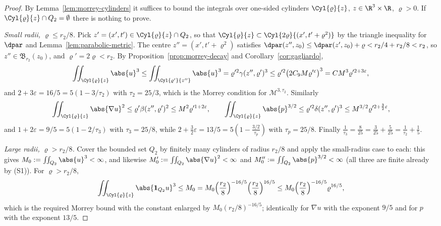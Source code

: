 \documentclass[11pt,reqno]{amsart}
\begin{document}
\begin{proof}
By Lemma~\ref{lem:morrey-cylinders} it suffices to bound the integrals over
one-sided cylinders $\Cyl{\varrho}{z}$, $z\in\R^{3}\times\R$, $\varrho>0$. If
$\Cyl{\varrho}{z}\cap Q_{2}=\emptyset$ there is nothing to prove.

\emph{Small radii, $\varrho\le r_{2}/8$.} Pick
$z'=(x',t')\in\Cyl{\varrho}{z}\cap Q_{2}$, so that
$\Cyl{\varrho}{z}\subset\Cyl{2\varrho}{(x',t'+\varrho^{2})}$ by the triangle
inequality for $\dpar$ and Lemma~\ref{lem:parabolic-metric}. The centre
$z''=(x',t'+\varrho^{2})$ satisfies
$\dpar(z'',z_{0})\le\dpar(z',z_{0})+\varrho<r_{2}/4+r_{2}/8<r_{2}$, so
$z''\in\mathfrak{B}_{r_{2}}(z_{0})$, and $\varrho'=2\varrho<r_{2}$. By Proposition~\ref{prop:morrey-decay} and
Corollary~\ref{cor:gagliardo},
\[
  \iint_{\Cyl{\varrho}{z}}\abs{u}^{3}
  \le\iint_{\Cyl{\varrho'}{z''}}\abs{u}^{3}
  =\varrho'^{2}\gamma(z'',\varrho')^{3}
  \le\varrho'^{2}\bigl(2C_{9}M\varrho'^{\varepsilon}\bigr)^{3}
  =C M^{3}\varrho'^{2+3\varepsilon},
\]
and $2+3\varepsilon=16/5=5(1-3/\tau_{2})$ with $\tau_{2}=25/3$, which is the
Morrey condition for $\mathcal{M}^{3,\tau_{2}}$. Similarly
\[
  \iint_{\Cyl{\varrho}{z}}\abs{\nabla u}^{2}\le\varrho'\beta(z'',\varrho')^{2}
  \le M^{2}\varrho'^{1+2\varepsilon},
  \qquad
  \iint_{\Cyl{\varrho}{z}}\abs{p}^{3/2}\le\varrho'^{2}\delta(z'',\varrho')^{3}
  \le M^{3/2}\varrho'^{2+\frac32\varepsilon},
\]
and $1+2\varepsilon=9/5=5(1-2/\tau_{3})$ with $\tau_{3}=25/8$, while
$2+\tfrac32\varepsilon=13/5=5(1-\tfrac{3/2}{\tau_{p}})$ with $\tau_{p}=25/8$.
Finally $\tfrac1{\tau_{3}}=\tfrac8{25}=\tfrac3{25}+\tfrac5{25}
 =\tfrac1{\tau_{2}}+\tfrac15$.

\emph{Large radii, $\varrho>r_{2}/8$.} Cover the bounded set $Q_{2}$ by finitely
many cylinders of radius $r_{2}/8$ and apply the small-radius case to each: this
gives $M_{0}:=\iint_{Q_{2}}\abs{u}^{3}<\infty$, and likewise
$M_{0}':=\iint_{Q_{2}}\abs{\nabla u}^{2}<\infty$ and
$M_{0}'':=\iint_{Q_{2}}\abs{p}^{3/2}<\infty$ (all three are finite already by
(S1)). For $\varrho>r_{2}/8$,
\[
  \iint_{\Cyl{\varrho}{z}}\abs{\mathbf{1}_{Q_{2}}u}^{3}\le M_{0}
  =M_{0}\Bigl(\frac{r_{2}}8\Bigr)^{-16/5}\Bigl(\frac{r_{2}}8\Bigr)^{16/5}
  \le M_{0}\Bigl(\frac{r_{2}}8\Bigr)^{-16/5}\varrho^{16/5},
\]
which is the required Morrey bound with the constant enlarged by
$M_{0}(r_{2}/8)^{-16/5}$; identically for $\nabla u$ with the exponent $9/5$ and
for $p$ with the exponent $13/5$.
\end{proof}
\end{document}
